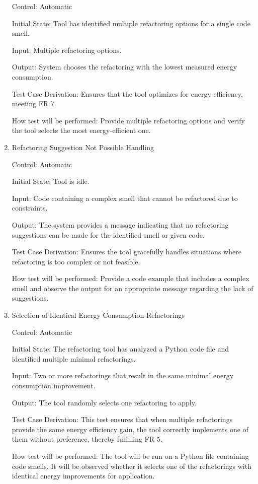 \documentclass[12pt, titlepage]{article}
\begin{document}
\begin{enumerate}
  Control: Automatic
            
  Initial State: Tool has identified multiple refactoring options for a single code smell.
            
  Input: Multiple refactoring options.
            
  Output: System chooses the refactoring with the lowest measured energy consumption.
  
  Test Case Derivation: Ensures that the tool optimizes for energy efficiency, meeting FR 7.
            
  How test will be performed: Provide multiple refactoring options and verify the tool selects the most energy-efficient one.
  
  \item{Refactoring Suggestion Not Possible Handling\\}

  Control: Automatic
  
  Initial State: Tool is idle.
  
  Input: Code containing a complex smell that cannot be refactored due to constraints.
  
  Output: The system provides a message indicating that no refactoring suggestions can be made for the identified smell or given code.
  
  Test Case Derivation: Ensures the tool gracefully handles situations where refactoring is too complex or not feasible.
  
  How test will be performed: Provide a code example that includes a complex smell and observe the output for an appropriate message regarding the lack of suggestions.

  \item{Selection of Identical Energy Consumption Refactorings\\}

  Control: Automatic
  
  Initial State: The refactoring tool has analyzed a Python code file and identified multiple minimal refactorings.
  
  Input: Two or more refactorings that result in the same minimal energy consumption improvement.
  
  Output: The tool randomly selects one refactoring to apply.
  
  Test Case Derivation: This test ensures that when multiple refactorings provide the same energy efficiency gain, the tool correctly implements one of them without preference, thereby fulfilling FR 5.
  
  How test will be performed: The tool will be run on a Python file containing code smells. It will be observed whether it selects one of the refactorings with identical energy improvements for application.
\end{enumerate}
\end{document}
